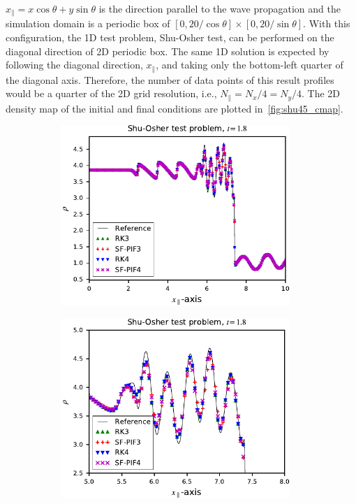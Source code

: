 \( x_{\parallel} = x \cos{\theta} + y \sin{\theta} \) is the direction
parallel to the wave propagation and the simulation domain is a periodic box of
\( [0, 20/\cos{\theta}] \times [0, 20/\sin{\theta}] \).
With this configuration, the 1D test problem, Shu-Osher test,
can be performed on the diagonal direction of 2D periodic box.
The same 1D solution is expected by following the diagonal direction, \( x_{\parallel} \),
and taking only the bottom-left quarter of the diagonal axis.
Therefore, the number of data points of this result profiles
would be a quarter of the 2D grid resolution,
i.e., \( N_{\parallel} = N_{x}/4 = N_{y}/4 \).
The 2D density map of the initial and final conditions are plotted in~\cref{fig:shu45_cmap}.

\begin{figure}
    \centering
    \begin{subfigure}{70mm}
        \centering
        \includegraphics[width=0.95\textwidth]{fig/shu45_weno5_256}
    \end{subfigure}
    \begin{subfigure}{70mm}
        \centering
        \includegraphics[width=0.95\textwidth]{fig/shu45_weno5_256_zoomed}

\end{subfigure}
\end{figure}
